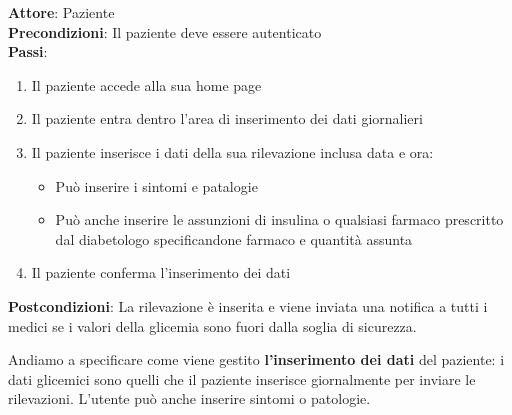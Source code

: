 \documentclass[a4paper]{article}
\begin{document}
\begin{mdframed}
  \textbf{Attore}: Paziente\\
  \textbf{Precondizioni}: Il paziente deve essere autenticato\\
  \textbf{Passi}: 
  \begin{enumerate}[nosep]
    \item Il paziente accede alla sua home page
    \item Il paziente entra dentro l'area di inserimento dei dati giornalieri
    \item  Il paziente inserisce i dati della sua rilevazione inclusa data e ora:
      \begin{itemize}
        \item  Può inserire i sintomi e patalogie
        \item  Può anche inserire le assunzioni di insulina o qualsiasi farmaco prescritto dal diabetologo specificandone farmaco e quantità assunta
      \end{itemize}
    \item Il paziente conferma l'inserimento dei dati
  \end{enumerate}
  \textbf{Postcondizioni}: La rilevazione è inserita e viene inviata una notifica
  a tutti i medici se i valori della glicemia sono fuori dalla soglia di sicurezza.
\end{mdframed}
\noindent
Andiamo a specificare come viene gestito \textbf{l'inserimento dei dati} del paziente: i dati glicemici sono quelli
che il paziente inserisce giornalmente per inviare le rilevazioni. L'utente può anche inserire sintomi 
o patologie.
\end{document}
